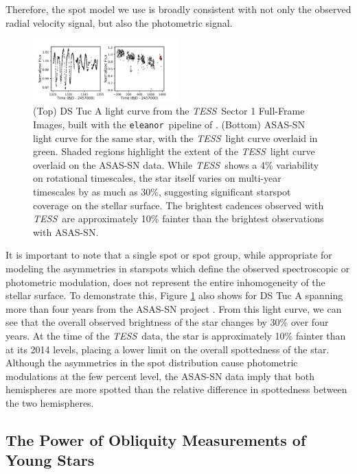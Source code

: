 \documentclass[twocolumn]{aastex63}
\newcommand{\tess}{{\it TESS}}
\newcommand{\eleanor}{\texttt{eleanor}}
\begin{document}
Therefore, the spot model we use is broadly consistent with not only the observed radial velocity signal, but also the photometric signal.


\begin{figure}[!tbh]
  \begin{center}
    \includegraphics[width=0.5\textwidth, trim={0cm 0.0cm 0cm 0cm}, clip=true]{../figures/lcs.pdf}
   \end{center}
  \caption{(Top) DS Tuc A light curve from the \tess\ Sector 1 Full-Frame Images, built with the \eleanor\ pipeline of \citet{Feinstein19}. (Bottom) ASAS-SN light curve for the same star, with the \tess\ light curve overlaid in green. Shaded regions highlight the extent of the \tess\ light curve overlaid on the ASAS-SN data. While \tess\ shows a 4\% variability on rotational timescales, the star itself varies on multi-year timescales by as much as 30\%, suggesting significant starspot coverage on the stellar surface. The brightest cadences observed with \tess\ are approximately 10\% fainter than the brightest observations with ASAS-SN.}
  \label{fig:lc_data}
\end{figure}

It is important to note that a single spot or spot group, while appropriate for modeling the asymmetries in starspots which define the observed spectroscopic or photometric modulation, does not represent the entire inhomogeneity of the stellar surface. 
To demonstrate this, Figure \ref{fig:lc_data} also shows for DS Tuc A spanning more than four years from the ASAS-SN project \citep{Shappee14, Kochanek17}.
From this light curve, we can see that the overall observed brightness of the star changes by 30\% over four years. 
At the time of the \tess\ data, the star is approximately 10\% fainter than at its 2014 levels, placing a lower limit on the overall spottedness of the star. 
Although the asymmetries in the spot distribution cause photometric modulations at the few percent level, the ASAS-SN data imply that both hemispheres are more spotted than the relative difference in spottedness between the two hemispheres.


\subsection{The Power of Obliquity Measurements of Young Stars}
\end{document}
